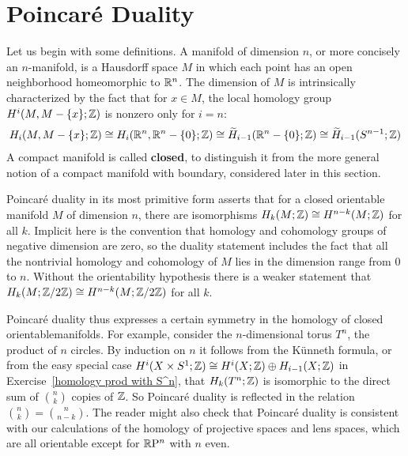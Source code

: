 \section{Poincar\'e Duality}
Let us begin with some definitions. A manifold of dimension $n$, or more concisely an $n$-manifold, is a Hausdorff space $M$ in which each point has an open neighborhood homeomorphic to $\mathbb{R}^n$. The dimension of $M$ is intrinsically characterized by the fact that for $x\in M$, the local homology group $H^i(M,M-\{x\};\mathbb{Z})$ is nonzero only for $i=n$:
\begin{align*}
H_i(M,M-\{x\};\mathbb{Z})\cong H_i(\mathbb{R}^n,\mathbb{R}^n-\{0\};\mathbb{Z})\cong\widetilde{H}_{i-1}(\mathbb{R}^n-\{0\};\mathbb{Z})\cong\widetilde{H}_{i-1}(S^{n-1};\mathbb{Z})
\end{align*}
A compact manifold is called \textbf{closed}, to distinguish it from the more general notion of a compact manifold with boundary, considered later in this section.\par
Poincar\'e duality in its most primitive form asserts that for a closed orientable manifold $M$ of dimension $n$, there are isomorphisms $H_k(M;\mathbb{Z})\cong H^{n-k}(M;\mathbb{Z})$ for all $k$. Implicit here is the convention that homology and cohomology groups of negative dimension are zero, so the duality statement includes the fact that all the nontrivial homology and cohomology of $M$ lies in the dimension range from $0$ to $n$. Without the orientability hypothesis there is a weaker statement that $H_k(M;\mathbb{Z}/2\mathbb{Z})\cong H^{n-k}(M;\mathbb{Z}/2\mathbb{Z})$ for all $k$.\par
Poincar\'e duality thus expresses a certain symmetry in the homology of closed
orientablemanifolds. For example, consider the $n$-dimensional torus $T^n$, the product of $n$ circles. By induction on $n$ it follows from the K\"unneth formula, or from the easy special case $H^i(X\times S^1;\mathbb{Z})\cong H^i(X;\mathbb{Z})\oplus H_{i-1}(X;\mathbb{Z})$ in Exercise~\ref{homology prod with S^n}, that
$H_k(T^n;\mathbb{Z})$ is isomorphic to the direct sum of $\binom{n}{k}$ copies of $\mathbb{Z}$. So Poincar\'e duality is reflected in the relation $\binom{n}{k}=\binom{n}{n-k}$. The reader might also check that Poincar\'e
duality is consistent with our calculations of the homology of projective spaces and lens spaces, which are all orientable except for $\mathbb{R}\mathrm{P}^n$ with $n$ even.
